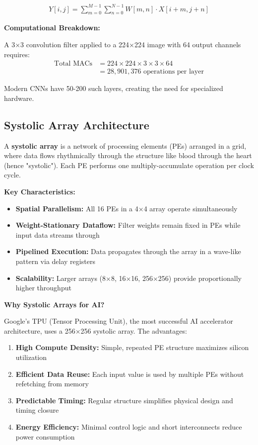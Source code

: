 \documentclass[12pt,a4paper]{article}
\begin{document}
\begin{align}
    Y[i,j] = \sum_{m=0}^{M-1} \sum_{n=0}^{N-1} W[m,n] \cdot X[i+m, j+n]
\end{align}

\textbf{Computational Breakdown:}

A 3×3 convolution filter applied to a 224×224 image with 64 output channels requires:
\begin{align}
    \text{Total MACs} &= 224 \times 224 \times 3 \times 3 \times 64 \nonumber \\
    &= 28,901,376 \text{ operations per layer}
\end{align}

Modern CNNs have 50-200 such layers, creating the need for specialized hardware.

\subsection{Systolic Array Architecture}

A \textbf{systolic array} is a network of processing elements (PEs) arranged in a grid, where data flows rhythmically through the structure like blood through the heart (hence "systolic"). Each PE performs one multiply-accumulate operation per clock cycle.

\textbf{Key Characteristics:}

\begin{itemize}
    \item \textbf{Spatial Parallelism:} All 16 PEs in a 4×4 array operate simultaneously
    \item \textbf{Weight-Stationary Dataflow:} Filter weights remain fixed in PEs while input data streams through
    \item \textbf{Pipelined Execution:} Data propagates through the array in a wave-like pattern via delay registers
    \item \textbf{Scalability:} Larger arrays (8×8, 16×16, 256×256) provide proportionally higher throughput
\end{itemize}

\textbf{Why Systolic Arrays for AI?}

Google's TPU (Tensor Processing Unit), the most successful AI accelerator architecture, uses a 256×256 systolic array. The advantages:

\begin{enumerate}
    \item \textbf{High Compute Density:} Simple, repeated PE structure maximizes silicon utilization
    \item \textbf{Efficient Data Reuse:} Each input value is used by multiple PEs without refetching from memory
    \item \textbf{Predictable Timing:} Regular structure simplifies physical design and timing closure
    \item \textbf{Energy Efficiency:} Minimal control logic and short interconnects reduce power consumption
\end{enumerate}
\end{document}
